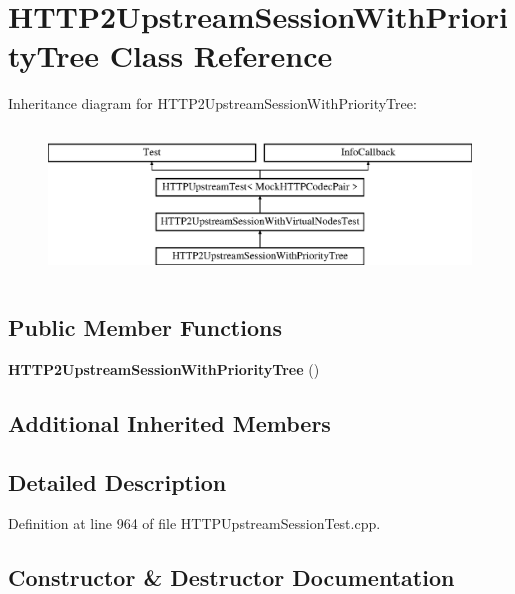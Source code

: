 \section{H\+T\+T\+P2\+Upstream\+Session\+With\+Priority\+Tree Class Reference}
\label{classHTTP2UpstreamSessionWithPriorityTree}
Inheritance diagram for H\+T\+T\+P2\+Upstream\+Session\+With\+Priority\+Tree\+:\begin{figure}[H]
\begin{center}
\leavevmode
\includegraphics[height=4.000000cm]{classHTTP2UpstreamSessionWithPriorityTree}
\end{center}
\end{figure}
\subsection*{Public Member Functions}
\begin{DoxyCompactItemize}
\item 
{\bf H\+T\+T\+P2\+Upstream\+Session\+With\+Priority\+Tree} ()
\end{DoxyCompactItemize}
\subsection*{Additional Inherited Members}


\subsection{Detailed Description}


Definition at line 964 of file H\+T\+T\+P\+Upstream\+Session\+Test.\+cpp.



\subsection{Constructor \& Destructor Documentation}
